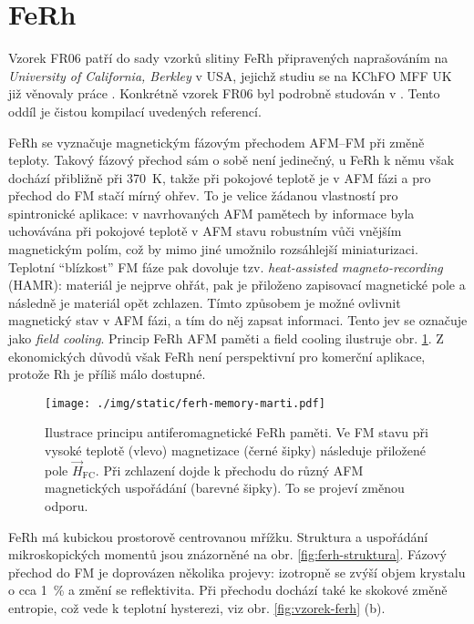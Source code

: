 \section{FeRh}
\label{chap:vzorek-ferh}

Vzorek FR06 patří do sady vzorků slitiny FeRh připravených naprašováním na \emph{University of California, Berkley} v USA, jejichž studiu se na KChFO MFF UK již věnovaly práce \cite{brajerLaserovaSpektroskopieMaterialu2015,saidlUltrarychlaLaserovaSpektroskopie2018,kubascikMagnetooptickeStudiumAntiferomagnetickych2019,saidlInvestigationMagnetostructuralPhase2016}.
Konkrétně vzorek FR06 byl podrobně studován v \cite{saidlUltrarychlaLaserovaSpektroskopie2018,kubascikMagnetooptickeStudiumAntiferomagnetickych2019}.
Tento oddíl je čistou kompilací uvedených referencí.

FeRh se vyznačuje magnetickým fázovým přechodem AFM--FM při změně teploty.
Takový fázový přechod sám o sobě není jedinečný, u FeRh k němu však dochází přibližně při \SI{370}{\kelvin}, takže při pokojové teplotě je v AFM fázi a pro přechod do FM stačí mírný ohřev.
To je velice žádanou vlastností pro spintronické aplikace: v navrhovaných AFM pamětech by informace byla uchovávána při pokojové teplotě v AFM stavu robustním vůči vnějším magnetickým polím, což by mimo jiné umožnilo rozsáhlejší miniaturizaci.
Teplotní ``blízkost'' FM fáze pak dovoluje tzv. \emph{heat-assisted magneto-recording} (HAMR): materiál je nejprve ohřát, pak je přiloženo zapisovací magnetické pole a následně je materiál opět zchlazen.
Tímto způsobem je možné ovlivnit magnetický stav v AFM fázi, a tím do něj zapsat informaci.
Tento jev se označuje jako \emph{field cooling}.
Princip FeRh AFM paměti a field cooling ilustruje obr. \ref{fig:ferh-memory}.
Z ekonomických důvodů však FeRh není perspektivní pro komerční aplikace, protože Rh je příliš málo dostupné.

\begin{figure}[htbp]
    \centering
    \texttt{[image: ./img/static/ferh-memory-marti.pdf]}
    \caption{Ilustrace principu antiferomagnetické FeRh paměti.
        Ve FM stavu při vysoké teplotě (vlevo) magnetizace (černé šipky) následuje přiložené pole $\vec{H}_\textrm{FC}$. 
        Při zchlazení dojde k přechodu do různý AFM magnetických uspořádání (barevné šipky). To se projeví změnou odporu. \cite{martiRoomtemperatureAntiferromagneticMemory2014}}
    \label{fig:ferh-memory}
\end{figure}

FeRh má kubickou prostorově centrovanou mřížku.
Struktura a uspořádání mikroskopických momentů jsou znázorněné na obr. \ref{fig:ferh-struktura}.
Fázový přechod do FM je doprovázen několika projevy: izotropně se zvýší objem krystalu o cca \SI{1}{\percent} a změní se reflektivita\cite{saidlInvestigationMagnetostructuralPhase2016}.
Při přechodu dochází také ke skokové změně entropie, což vede k teplotní hysterezi, viz obr. \ref{fig:vzorek-ferh} (b).

